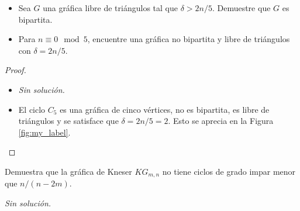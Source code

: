 \documentclass[12pt]{article}
\newenvironment{problem}[2][Problema]{\begin{trivlist}
\item[\hskip \labelsep {\bfseries #1}\hskip \labelsep {\bfseries #2.}]}{\end{trivlist}}
\begin{document}
\begin{problem}{2.1.18}\text{}
\begin{itemize}
    \item[a)] Sea $G$ una gráfica libre de triángulos tal que $\delta > 2n / 5$. Demuestre que $G$ es bipartita. 
    \item[b)] Para $n \equiv 0 \mod{5}$, encuentre una gráfica no bipartita y libre de triángulos con $\delta = 2n/5.$
\end{itemize}
\end{problem}

\begin{proof}
\textbf{}
\begin{itemize}
    \item[a)] \textit{Sin solución.} 
    
    
    
    
    
    \item[b)] El ciclo $C_5$ es una gráfica de cinco vértices, no es bipartita, es libre de triángulos y se satisface que $\delta = 2n/5 = 2$. Esto se aprecia en la Figura \ref{fig:my_label}.
\end{itemize}
\end{proof}


\begin{problem}{2.1.20}
Demuestra que la gráfica de Kneser $KG_{m,n}$ no tiene ciclos de grado impar menor que $n/(n-2m).$
\end{problem}
\textit{Sin solución.}
\end{document}
